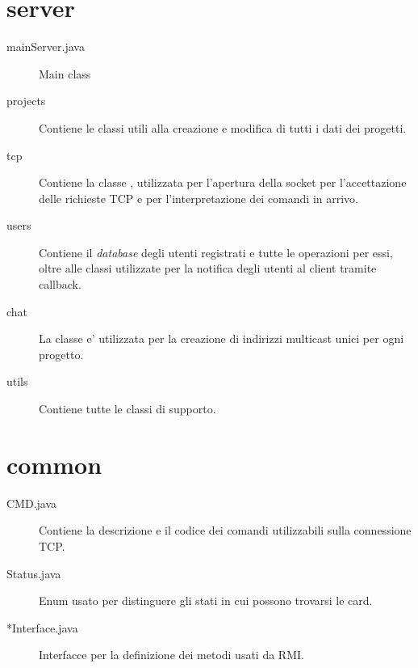 \section*{server}

\begin{description}
    \item[mainServer.java] {\color{red}Main class}
    \item[projects] Contiene le classi utili alla creazione e modifica di tutti i dati dei progetti.
    \item[tcp] Contiene la classe , utilizzata per l'apertura della socket per l'accettazione delle richieste TCP e per l'interpretazione dei comandi in arrivo.
    \item[users] Contiene il \textit{database} degli utenti registrati e tutte le operazioni per essi, oltre alle classi utilizzate per la notifica degli utenti al client tramite callback.
    \item[chat] La classe  e' utilizzata per la creazione di indirizzi multicast unici per ogni progetto.
    \item[utils] Contiene tutte le classi di supporto.
\end{description}

\section*{common}


\begin{description}
    \item[CMD.java] Contiene la descrizione e il codice dei comandi utilizzabili sulla connessione TCP.
    \item[Status.java] Enum usato per distinguere gli stati in cui possono trovarsi le card.
    \item[*Interface.java] Interfacce per la definizione dei metodi usati da RMI. 
\end{description}

